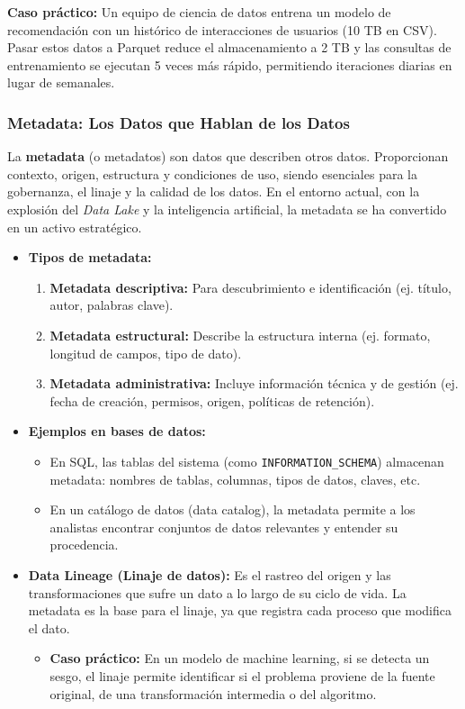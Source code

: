 \documentclass[12pt,a4paper,openany,oneside]{book}
\begin{document}
\textbf{Caso práctico:} Un equipo de ciencia de datos entrena un modelo de recomendación con un histórico de interacciones de usuarios (10 TB en CSV). Pasar estos datos a Parquet reduce el almacenamiento a 2 TB y las consultas de entrenamiento se ejecutan 5 veces más rápido, permitiendo iteraciones diarias en lugar de semanales.


\subsubsection{Metadata: Los Datos que Hablan de los Datos}

La \textbf{metadata} (o metadatos) son datos que describen otros datos. Proporcionan contexto, origen, estructura y condiciones de uso, siendo esenciales para la gobernanza, el linaje y la calidad de los datos. En el entorno actual, con la explosión del \textit{Data Lake} y la inteligencia artificial, la metadata se ha convertido en un activo estratégico.

\begin{itemize}
    \item \textbf{Tipos de metadata:}
        \begin{enumerate}
            \item \textbf{Metadata descriptiva:} Para descubrimiento e identificación (ej. título, autor, palabras clave).
            \item \textbf{Metadata estructural:} Describe la estructura interna (ej. formato, longitud de campos, tipo de dato).
            \item \textbf{Metadata administrativa:} Incluye información técnica y de gestión (ej. fecha de creación, permisos, origen, políticas de retención).
        \end{enumerate}
    \item \textbf{Ejemplos en bases de datos:}
        \begin{itemize}
            \item En SQL, las tablas del sistema (como \texttt{INFORMATION\_SCHEMA}) almacenan metadata: nombres de tablas, columnas, tipos de datos, claves, etc.
            \item En un catálogo de datos (data catalog), la metadata permite a los analistas encontrar conjuntos de datos relevantes y entender su procedencia.
        \end{itemize}
    \item \textbf{Data Lineage (Linaje de datos):} Es el rastreo del origen y las transformaciones que sufre un dato a lo largo de su ciclo de vida. La metadata es la base para el linaje, ya que registra cada proceso que modifica el dato.
        \begin{itemize}
            \item \textbf{Caso práctico:} En un modelo de machine learning, si se detecta un sesgo, el linaje permite identificar si el problema proviene de la fuente original, de una transformación intermedia o del algoritmo.
        \end{itemize}
\end{itemize}
\end{document}
